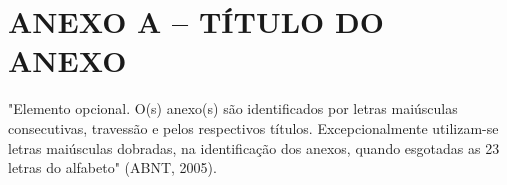\chapter{ANEXO A – TÍTULO DO ANEXO}
\label{lab:anexoA}

"Elemento opcional. O(s) anexo(s) são identificados por letras maiúsculas consecutivas, travessão e pelos respectivos títulos. 
Excepcionalmente utilizam-se letras maiúsculas dobradas, na identificação dos anexos, quando esgotadas as 23 letras do alfabeto" (ABNT, 2005).
